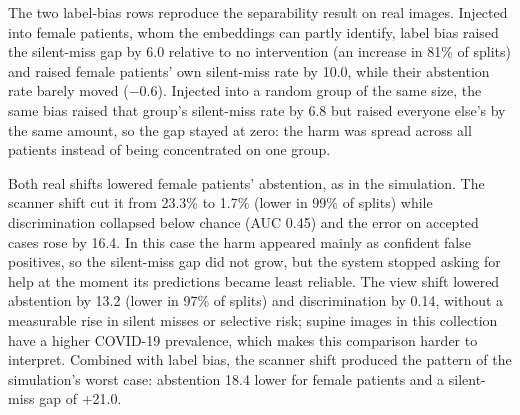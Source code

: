 The two label-bias rows reproduce the separability result on real images. Injected into female patients, whom the embeddings can partly identify, label bias raised the silent-miss gap by 6.0\pp{} relative to no intervention (an increase in 81\% of splits) and raised female patients' own silent-miss rate by 10.0\pp, while their abstention rate barely moved ($-0.6$\pp). Injected into a random group of the same size, the same bias raised that group's silent-miss rate by 6.8\pp{} but raised everyone else's by the same amount, so the gap stayed at zero: the harm was spread across all patients instead of being concentrated on one group.

Both real shifts lowered female patients' abstention, as in the simulation. The scanner shift cut it from 23.3\% to 1.7\% (lower in 99\% of splits) while discrimination collapsed below chance (AUC 0.45) and the error on accepted cases rose by 16.4\pp. In this case the harm appeared mainly as confident false positives, so the silent-miss gap did not grow, but the system stopped asking for help at the moment its predictions became least reliable. The view shift lowered abstention by 13.2\pp{} (lower in 97\% of splits) and discrimination by 0.14, without a measurable rise in silent misses or selective risk; supine images in this collection have a higher COVID-19 prevalence, which makes this comparison harder to interpret. Combined with label bias, the scanner shift produced the pattern of the simulation's worst case: abstention 18.4\pp{} lower for female patients and a silent-miss gap of +21.0\pp.
